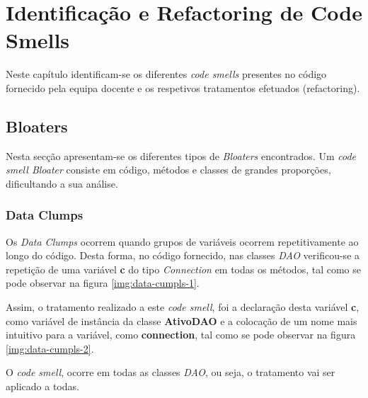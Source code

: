 \chapter{Identificação e Refactoring de Code Smells}
\hspace{5mm} Neste capítulo identificam-se os diferentes \emph{code smells} presentes no código fornecido pela equipa docente e os respetivos tratamentos efetuados (refactoring).

\section{Bloaters}
\hspace{5mm} Nesta secção apresentam-se os diferentes tipos de \emph{Bloaters} encontrados. Um \emph{code smell Bloater} consiste em código, métodos e classes de grandes proporções, dificultando a sua análise.

\subsection{Data Clumps}
\hspace{5mm} Os \emph{Data Clumps} ocorrem quando grupos de variáveis ocorrem repetitivamente ao longo do código. Desta forma, no código fornecido, nas classes \emph{DAO} verificou-se a repetição de uma variável \textbf{c} do tipo \emph{Connection} em todas os métodos, tal como se pode observar na figura \ref{img:data-cumpls-1}.

\hspace{5mm} Assim, o tratamento realizado a este \emph{code smell}, foi a declaração desta variável \textbf{c}, como variável de instância da classe \textbf{AtivoDAO} e a colocação de um nome mais intuitivo para a variável, como \textbf{connection}, tal como se pode observar na figura \ref{img:data-cumpls-2}. 

\hspace{5mm} O \emph{code smell}, ocorre em todas as classes \emph{DAO}, ou seja, o tratamento vai ser aplicado a todas.

